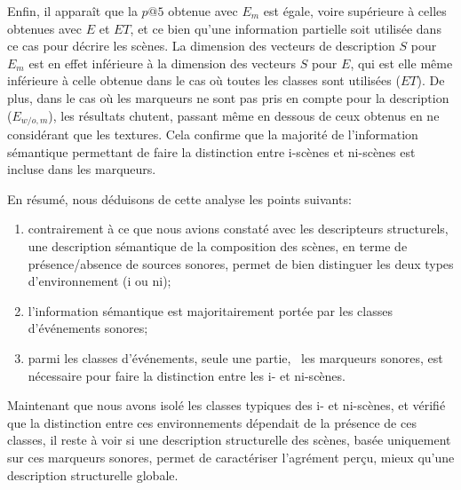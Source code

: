 Enfin, il apparaît que la $p@5$ obtenue avec $E_{m}$ est égale, voire supérieure à celles obtenues avec $E$ et $ET$, et ce bien qu'une information partielle soit utilisée dans ce cas pour décrire les scènes. La dimension des vecteurs de description $S$ pour $E_m$ est en effet inférieure à la dimension des vecteurs $S$ pour $E$, qui est elle même inférieure à celle obtenue dans le cas où toutes les classes sont utilisées ($ET$). De plus, dans le cas où les marqueurs ne sont pas pris en compte pour la description ($E_{w/o,m}$), les résultats chutent, passant même en dessous de ceux obtenus en ne considérant que les textures. Cela confirme que la majorité de l'information sémantique permettant de faire la distinction entre i-scènes et ni-scènes est incluse dans les marqueurs.

En résumé, nous déduisons de cette analyse les points suivants:

\begin{enumerate}
\item contrairement à ce que nous avions constaté avec les descripteurs structurels, une description sémantique de la composition des scènes, en terme de présence/absence de sources sonores, permet de bien distinguer les deux types d'environnement (i ou ni);
\item l'information sémantique est majoritairement portée par les classes d'événements sonores;
\item parmi les classes d'événements, seule une partie, \ie~les marqueurs sonores, est nécessaire pour faire la distinction entre les i- et ni-scènes.
\end{enumerate}

Maintenant que nous avons isolé les classes typiques des i- et ni-scènes, et vérifié que la distinction entre ces environnements dépendait de la présence de ces classes, il reste à voir si une description structurelle des scènes, basée uniquement sur ces marqueurs sonores, permet de caractériser l'agrément perçu, mieux qu'une description structurelle globale. 

